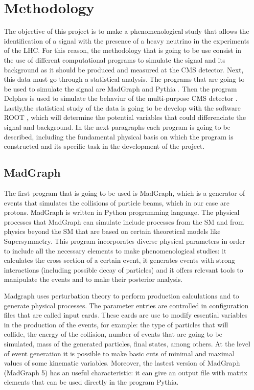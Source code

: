 \chapter{Methodology} 

The objective of this project is to make a phenomenological study that allows the identification of a signal with the presence of a heavy neutrino in the experiments of the LHC. For this reason, 
the methodology that is going to be use consist in the use of different computational programs to simulate the signal and its background as it should be produced and measured at the CMS detector. Next, this data must go through a statistical analysis. The programs that are going to be used to simulate the signal are MadGraph \cite{MadGraph 1, MadGraph 2} and Pythia \cite{Pythia}. Then the program Delphes is used to simulate the behaviur of the multi-purpose CMS detector \cite{Delphes}. Lastly,the statistical study of the data is going to be develop with the software ROOT \cite{Root}, which will determine the potential variables that could differenciate the signal and background. In the next paragraphs each program is going to be described, including the fundamental physical basis on which the program is constructed and its specific task in the development of the project.

\section{MadGraph}

The first program that is going to be used is MadGraph, which is a generator of events that simulates the collisions of particle beams, which in our case are protons. MadGraph is written in Python programming language. The physical processes that MadGraph can simulate include processes from the SM and from physics beyond the SM that are based on certain theoretical models like Supersymmetry. This program incorporates diverse physical parameters in order to include all the necessary elements to make phenomenological studies: it calculates the cross section of a certain event, it generates events with strong interactions (including possible decay of particles) and it offers relevant tools to manipulate the events and to make their posterior analysis. 

Madgraph uses perturbation theory to perform production calculations and to generate physical processes. The parameter entries are controlled in configuration files that are called input cards. 
These cards are use to modify essential variables in the production of the events, for example: the type of particles that will collide, the energy of the collision, number of events that are going to be simulated, mass of the generated particles, final states, among others. At the level of event generation it is possible to make basic cuts of minimal and maximal values of some kinematic variables. Moreover, the lastest version of MadGraph (MadGraph 5) has an useful characteristic: it can give an output file with matrix elements that can be used directly in the program Pythia. 

